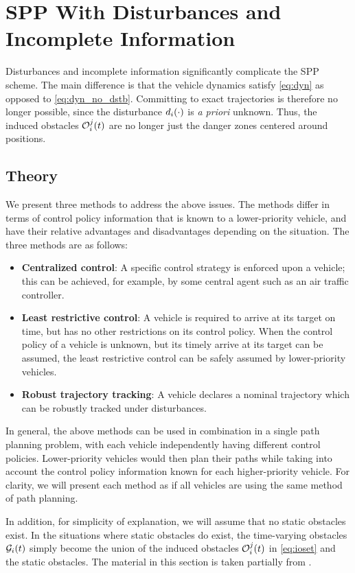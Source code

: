 \section{SPP With Disturbances and Incomplete Information \label{sec:incomp}}
Disturbances and incomplete information significantly complicate the SPP scheme. The main difference is that the vehicle dynamics satisfy \eqref{eq:dyn} as opposed to \eqref{eq:dyn_no_dstb}. Committing to exact trajectories is therefore no longer possible, since the disturbance $d_i(\cdot)$ is \textit{a priori} unknown. Thus, the induced obstacles $\mathcal{O}_i^j(t)$ are no longer just the danger zones centered around positions. 

\subsection{Theory}
We present three methods to address the above issues. The methods differ in terms of control policy information that is known to a lower-priority vehicle, and have their relative advantages and disadvantages depending on the situation. The three methods are as follows:
\begin{itemize}
\item \textbf{Centralized control}: A specific control strategy is enforced upon a vehicle; this can be achieved, for example, by some central agent such as an air traffic controller.
\item \textbf{Least restrictive control}: A vehicle is required to arrive at its target on time, but has no other restrictions on its control policy. When the control policy of a vehicle is unknown, but its timely arrive at its target can be assumed, the least restrictive control can be safely assumed by lower-priority vehicles.
\item \textbf{Robust trajectory tracking}: A vehicle declares a nominal trajectory which can be robustly tracked under disturbances.
\end{itemize}

In general, the above methods can be used in combination in a single path planning problem, with each vehicle independently having different control policies. Lower-priority vehicles would then plan their paths while taking into account the control policy information known for each higher-priority vehicle. For clarity, we will present each method as if all vehicles are using the same method of path planning.

In addition, for simplicity of explanation, we will assume that no static obstacles exist. In the situations where static obstacles do exist, the time-varying obstacles $\mathcal{G}_i(t)$ simply become the union of the induced obstacles $\mathcal{O}_i^j(t)$ in \eqref{eq:ioset} and the static obstacles. The material in this section is taken partially from \cite{Bansal2017}.

